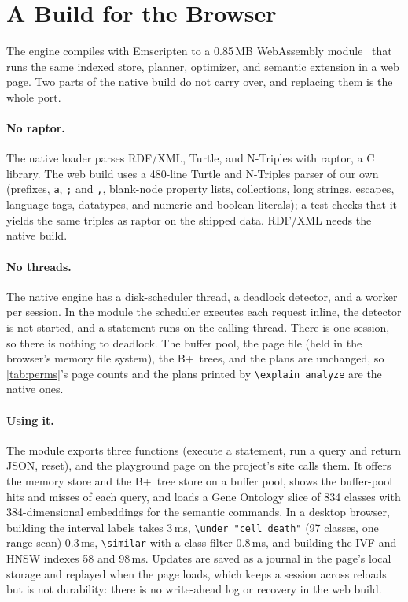 \documentclass[sigconf, nonacm]{acmart}
\begin{document}
\section{A Build for the Browser}
\label{sec:web}

The engine compiles with Emscripten to a 0.85\,MB WebAssembly module~\cite{haas2017} that runs the same indexed store, planner, optimizer, and semantic extension in a web page. Two parts of the native build do not carry over, and replacing them is the whole port.

\paragraph{No raptor.} The native loader parses RDF/XML, Turtle, and N-Triples with raptor, a C library. The web build uses a 480-line Turtle and N-Triples parser of our own (prefixes, \texttt{a}, \texttt{;} and \texttt{,}, blank-node property lists, collections, long strings, escapes, language tags, datatypes, and numeric and boolean literals); a test checks that it yields the same triples as raptor on the shipped data. RDF/XML needs the native build.

\paragraph{No threads.} The native engine has a disk-scheduler thread, a deadlock detector, and a worker per session. In the module the scheduler executes each request inline, the detector is not started, and a statement runs on the calling thread. There is one session, so there is nothing to deadlock. The buffer pool, the page file (held in the browser's memory file system), the B+~trees, and the plans are unchanged, so \autoref{tab:perms}'s page counts and the plans printed by \texttt{\textbackslash explain analyze} are the native ones.

\paragraph{Using it.} The module exports three functions (execute a statement, run a query and return JSON, reset), and the playground page on the project's site calls them. It offers the memory store and the B+~tree store on a buffer pool, shows the buffer-pool hits and misses of each query, and loads a Gene Ontology slice of 834 classes with 384-dimensional embeddings for the semantic commands. In a desktop browser, building the interval labels takes 3\,ms, \texttt{\textbackslash under "cell death"} (97 classes, one range scan) 0.3\,ms, \texttt{\textbackslash similar} with a class filter 0.8\,ms, and building the IVF and HNSW indexes 58 and 98\,ms. Updates are saved as a journal in the page's local storage and replayed when the page loads, which keeps a session across reloads but is not durability: there is no write-ahead log or recovery in the web build.
\end{document}
